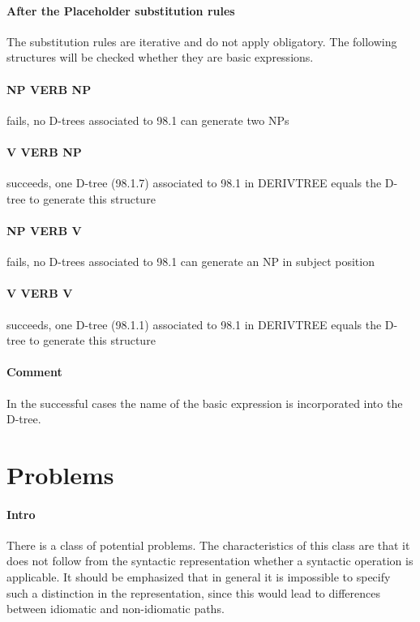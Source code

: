 \paragraph{After the Placeholder substitution rules}
The substitution rules are iterative and do not apply obligatory. The following 
structures will be checked whether they are basic expressions.

\paragraph{NP VERB NP}
fails, no D-trees associated to 98.1 can generate two NPs

\paragraph{V VERB NP}
succeeds, one D-tree (98.1.7) associated to 98.1 in DERIVTREE equals the
D-tree to generate this structure 

\paragraph{NP VERB V}
fails, no D-trees associated to 98.1 can generate an NP in subject position

\paragraph{V VERB V}
succeeds, one D-tree (98.1.1) associated to 98.1 in DERIVTREE equals the
D-tree to generate this structure 

\paragraph{Comment}
In the successful cases the name of the basic expression is incorporated into 
the D-tree.

\section{Problems}
\paragraph{Intro}
There is a class of potential problems. The characteristics of this class are
that it does not follow from the syntactic representation whether a syntactic 
operation is applicable. It should be emphasized that in general it is
impossible to specify such a distinction in the representation, since this 
would lead to differences between idiomatic and non-idiomatic paths. 

